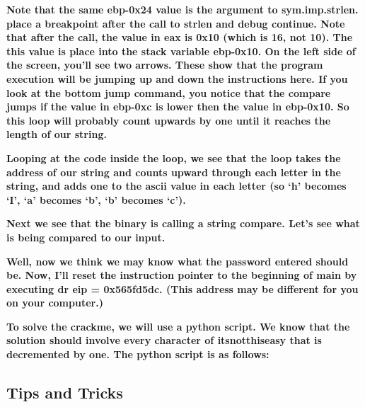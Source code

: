 \documentclass[letterpaper]{article}
\newcommand{\sitfig}[3]{
\begin{figure}[H]
\centering
\makebox[\textwidth][c]{
#2
}
\label{#1}
\end{figure}
}
\newcommand{\sitgfx}[4][scale=1.0]{
\sitfig{#3}{\texttt{[image: \#2]}}{#4}
}
\begin{document}
  
\sitgfx[width=6.5in,height=4.0626in]{reversing-img061.png}{fig:unk}{TODO CAPTION}
 

\textbf{Note that the same ebp-0x24 value is the argument to sym.imp.strlen. place a breakpoint after the call to strlen
and debug continue. Note that after the call, the value in eax is 0x10 (which is 16, not 10). The this value is place
into the stack variable ebp-0x10. On the left side of the screen, you'll see two arrows. These show that the program
execution will be jumping up and down the instructions here. If you look at the bottom jump command, you notice that
the compare jumps if the value in ebp-0xc is lower then the value in ebp-0x10. So this loop will probably count upwards
by one until it reaches the length of our string.}

  
\sitgfx[width=6.5in,height=4.0626in]{reversing-img062.png}{fig:unk}{TODO CAPTION}
 

\textbf{Looping at the code inside the loop, we see that the loop takes the address of our string and counts upward
through each letter in the string, and adds one to the ascii value in each letter (so `h' becomes `I', `a' becomes `b',
`b' becomes `c').}

  
\sitgfx[width=6.5in,height=4.0626in]{reversing-img063.png}{fig:unk}{TODO CAPTION}
 

\textbf{Next we see that the binary is calling a string compare. Let's see what is being compared to our input.}

  
\sitgfx[width=6.5in,height=4.0626in]{reversing-img064.png}{fig:unk}{TODO CAPTION}
 

\textbf{Well, now we think we may know what the password entered should be. Now, I'll reset the instruction pointer to
the beginning of main by executing dr eip = 0x565fd5dc. (This address may be different for you on your computer.)}

\textbf{To solve the crackme, we will use a python script. We know that the solution should involve every character of
itsnotthiseasy that is decremented by one. The python script is as follows:}

  
\sitgfx[width=6.5in,height=4.0626in]{reversing-img065.png}{fig:unk}{TODO CAPTION}
 

\subsection{Tips and Tricks}
\end{document}

